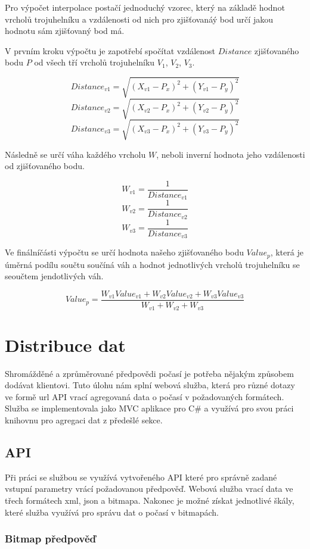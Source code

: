 \documentclass[czech,bachelor,dept460,male,csharp,cpdeclaration]{diploma}
\begin{document}
	Pro výpočet interpolace postačí jednoduchý vzorec, který na základě hodnot vrcholů trojuhelníku a vzdálenosti od nich pro zjišťovanáý bod určí jakou hodnotu sám zjišťovaný bod má.
	
	
	V prvním kroku výpočtu je zapotřebí spočítat vzdálenost $Distance$ zjišťovaného bodu $P$ od všech tří vrcholů trojuhelníku $V_1$, $V_2$, $V_3$. 
	
	\[Distance_{v1} =\sqrt{(X_{v1}-P_x)^2+(Y_{v1}-P_y)^2}\]
	\[Distance_{v2} =\sqrt{(X_{v2}-P_x)^2+(Y_{v2}-P_y)^2}\]
	\[Distance_{v3} =\sqrt{(X_{v3}-P_x)^2+(Y_{v3}-P_y)^2}\]
	
	Následně se určí váha každého vrcholu $W$, neboli inverní hodnota jeho vzdálenosti od zjišťovaného bodu.
	
	\[W_{v1} =\frac{1}{Distance_{v1}}\]
	\[W_{v2} =\frac{1}{Distance_{v2}}\]
	\[W_{v3} =\frac{1}{Distance_{v3}}\]
	
	Ve finálníčásti výpočtu se určí hodnota našeho zjišťovaného bodu $Value_p$, která je úměrná podílu součtu součíná váh a hodnot jednotlivých vrcholů trojuhelníku se seoučtem jendotlivých váh.
	
	\[Value_p = \frac{W_{v1}Value_{v1} + W_{v2}Value_{v2} + W_{v3}Value_{v3}}{W_{v1} + W_{v2} + W_{v3}} \]
	
	
	\section{Distribuce dat}
	
	Shromážděné a zprůměrované předpovědi počasí je potřeba nějakým způsobem dodávat klientovi. Tuto úlohu nám splní webová služba, která pro různé dotazy ve formě url API vrací agregovaná data o počasí v požadovaných formátech. Služba se implementovala jako MVC aplikace pro C\# a využívá pro svou práci knihovnu pro agregaci dat z předešlé sekce.
	
	\subsection{API}
	
	Při práci se službou se využívá vytvořeného API které pro správně zadané vstupní parametry vrácí požadovanou předpověď. Webová služba vrací data ve třech formátech xml, json a bitmapa. Nakonec je možné získat jednotlivé škály, které služba využívá pro správu dat o počasí v bitmapách.
	
	\subsubsection{Bitmap předpověď}
	
\end{document}
